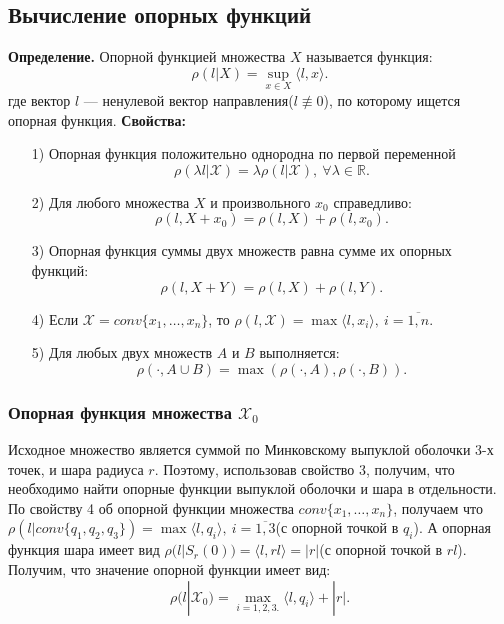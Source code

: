 \documentclass[11pt]{article}
\begin{document}
	{\subsection{Вычисление опорных функций}}
	{\hspace*{-0.8cm} \textbf{Определение.} Опорной функцией множества $X$ называется функция:}
	\[ \rho(l|X) = \underset{x \in X}{\operatorname{sup}} \langle l,x \rangle. \]
	{где вектор $l$ --- ненулевой вектор направления($l \not\equiv 0$), по которому ищется опорная функция. }
	\newline
	{\textbf{Свойства:}}
	\begin{itemize}
		\item[1)] {Опорная функция положительно однородна по первой переменной}\[\rho(\lambda l | \mathcal{X}) = \lambda \rho(l| \mathcal{X}), \ \forall \lambda \in \mathds{R}.  \]
		\item[2)] {Для любого множества $X$ и произвольного $x_{0}$ справедливо:}
		\[ \rho(l, X + x_{0}) = \rho(l,X) + \rho(l, x_{0}). \]
		\item[3)] {Опорная функция суммы двух множеств равна сумме их опорных функций:}
		\[ \rho(l,X + Y) = \rho(l,X) + \rho(l,Y). \]
		\item[4)] {Если $\mathcal{X} = conv\{x_{1},\ldots,x_{n}\}$, то $ \rho(l,\mathcal{X}) = \operatorname{max} \langle l, x_{i} \rangle, \ i = \overline{1,n}.$}
		\item[5)] {Для любых двух множеств $A$ и $B$ выполняется:} 
		\[ \rho(\cdot, A \cup B) = \operatorname{max}(\rho(\cdot, A),\rho(\cdot,B)). \] 
	\end{itemize}
	
	
	
	{\subsubsection{Опорная функция множества $\mathcal{X}_{0}$}}
	{Исходное множество является  суммой по Минковскому выпуклой оболочки 3-х точек, и шара радиуса $r$. Поэтому, использовав свойство 3, получим, что необходимо найти опорные функции выпуклой оболочки и шара в отдельности. По свойству 4 об опорной функции множества $conv\{x_1,\ldots,x_n\}$, получаем что $\rho(l|conv\{q_1,q_2,q_3\}) = \operatorname{max}\langle l,q_i\rangle, \ i = \overline{1,3}$(с опорной точкой в $q_i$). А опорная функция шара имеет вид $\rho(l|S_r(0)) = \langle l, rl  \rangle = |r|$(с опорной точкой в $rl$). }
	\newline
	{Получим, что значение опорной функции имеет вид:}
	\[ \rho(l|\mathcal{X}_{0}) = \underset{i = 1,2,3.}{\max}\langle l ,q_{i} \rangle + |r|. \]
	
\end{document}
